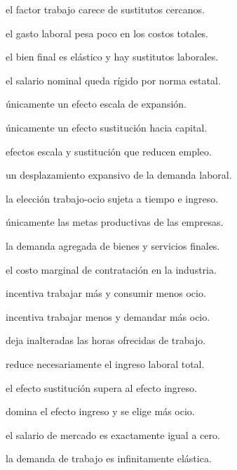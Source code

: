 \begin{opts}
    \item el factor trabajo carece de sustitutos cercanos.
    \item el gasto laboral pesa poco en los costos totales.
    \item el bien final es elástico y hay sustitutos laborales.
    \item el salario nominal queda rígido por norma estatal.
\end{opts}

\begin{opts}
    \item únicamente un efecto escala de expansión.
    \item únicamente un efecto sustitución hacia capital.
    \item efectos escala y sustitución que reducen empleo.
    \item un desplazamiento expansivo de la demanda laboral.
\end{opts}

\begin{opts}
    \item la elección trabajo-ocio sujeta a tiempo e ingreso.
    \item únicamente las metas productivas de las empresas.
    \item la demanda agregada de bienes y servicios finales.
    \item el costo marginal de contratación en la industria.
\end{opts}

\begin{opts}
    \item incentiva trabajar más y consumir menos ocio.
    \item incentiva trabajar menos y demandar más ocio.
    \item deja inalteradas las horas ofrecidas de trabajo.
    \item reduce necesariamente el ingreso laboral total.
\end{opts}

\begin{opts}
    \item el efecto sustitución supera al efecto ingreso.
    \item domina el efecto ingreso y se elige más ocio.
    \item el salario de mercado es exactamente igual a cero.
    \item la demanda de trabajo es infinitamente elástica.
\end{opts}

